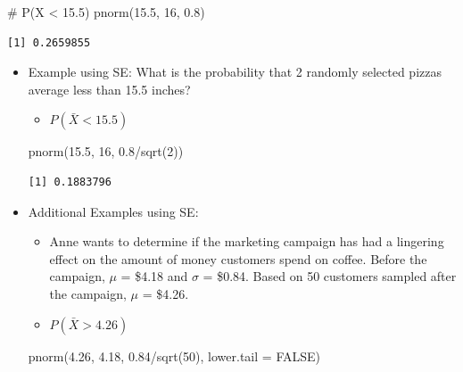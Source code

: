 \documentclass[
  letterpaper,
  DIV=11,
  numbers=noendperiod]{scrreprt}
\newenvironment{Shaded}{\begin{snugshade}}{\end{snugshade}}
\newcommand{\AttributeTok}[1]{\textcolor[rgb]{0.40,0.45,0.13}{#1}}
\newcommand{\CommentTok}[1]{\textcolor[rgb]{0.37,0.37,0.37}{#1}}
\newcommand{\ConstantTok}[1]{\textcolor[rgb]{0.56,0.35,0.01}{#1}}
\newcommand{\DecValTok}[1]{\textcolor[rgb]{0.68,0.00,0.00}{#1}}
\newcommand{\FloatTok}[1]{\textcolor[rgb]{0.68,0.00,0.00}{#1}}
\newcommand{\FunctionTok}[1]{\textcolor[rgb]{0.28,0.35,0.67}{#1}}
\newcommand{\NormalTok}[1]{\textcolor[rgb]{0.00,0.23,0.31}{#1}}
\newcommand{\SpecialCharTok}[1]{\textcolor[rgb]{0.37,0.37,0.37}{#1}}
\providecommand{\tightlist}{%
  \setlength{\itemsep}{0pt}\setlength{\parskip}{0pt}}\usepackage{longtable,booktabs,array}
\begin{document}
\begin{Shaded}
\begin{Highlighting}[]
\CommentTok{\# P(X \textless{} 15.5)}
\FunctionTok{pnorm}\NormalTok{(}\FloatTok{15.5}\NormalTok{, }\DecValTok{16}\NormalTok{, }\FloatTok{0.8}\NormalTok{)}
\end{Highlighting}
\end{Shaded}

\begin{verbatim}
[1] 0.2659855
\end{verbatim}

\begin{itemize}
\item
  Example using SE: What is the probability that 2 randomly selected
  pizzas average less than 15.5 inches?

  \begin{itemize}
  \tightlist
  \item
    \(P(\bar{X} < 15.5)\)
  \end{itemize}

\begin{Shaded}
\begin{Highlighting}[]
\FunctionTok{pnorm}\NormalTok{(}\FloatTok{15.5}\NormalTok{, }\DecValTok{16}\NormalTok{, }\FloatTok{0.8}\SpecialCharTok{/}\FunctionTok{sqrt}\NormalTok{(}\DecValTok{2}\NormalTok{))}
\end{Highlighting}
\end{Shaded}

\begin{verbatim}
[1] 0.1883796
\end{verbatim}
\item
  Additional Examples using SE:

  \begin{itemize}
  \tightlist
  \item
    Anne wants to determine if the marketing campaign has had a
    lingering effect on the amount of money customers spend on coffee.
    Before the campaign, \(\mu\) = \$4.18 and \(\sigma\) = \$0.84. Based
    on 50 customers sampled after the campaign, \(\mu\) = \$4.26.
  \item
    \(P(\bar{X} > 4.26)\)
  \end{itemize}

\begin{Shaded}
\begin{Highlighting}[]
\FunctionTok{pnorm}\NormalTok{(}\FloatTok{4.26}\NormalTok{, }\FloatTok{4.18}\NormalTok{, }\FloatTok{0.84}\SpecialCharTok{/}\FunctionTok{sqrt}\NormalTok{(}\DecValTok{50}\NormalTok{), }\AttributeTok{lower.tail =} \ConstantTok{FALSE}\NormalTok{)}
\end{Highlighting}
\end{Shaded}


\end{itemize}
\end{document}
